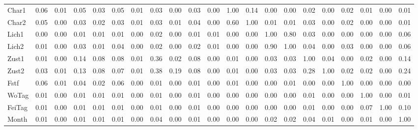 \begin{tabular}{lrrrrrrrrrrrrrrrrrrrr}
Char1   &     0.06 & 0.01 & 0.05 &   0.03 &   0.05 &   0.01 &   0.03 &   0.00 &   0.03 &   0.00 &   1.00 &   0.14 &   0.00 &   0.00 &   0.02 &   0.00 &  0.02 &   0.01 &    0.00 &   0.01 \\
Char2   &     0.05 & 0.00 & 0.03 &   0.02 &   0.03 &   0.01 &   0.03 &   0.01 &   0.04 &   0.00 &   0.60 &   1.00 &   0.01 &   0.01 &   0.03 &   0.00 &  0.02 &   0.00 &    0.00 &   0.01 \\
Lich1   &     0.00 & 0.00 & 0.01 &   0.01 &   0.01 &   0.00 &   0.02 &   0.00 &   0.01 &   0.01 &   0.00 &   0.00 &   1.00 &   0.80 &   0.03 &   0.00 &  0.00 &   0.00 &    0.00 &   0.06 \\
Lich2   &     0.01 & 0.00 & 0.03 &   0.01 &   0.04 &   0.00 &   0.02 &   0.00 &   0.02 &   0.01 &   0.00 &   0.00 &   0.90 &   1.00 &   0.04 &   0.00 &  0.03 &   0.00 &    0.00 &   0.06 \\
Zust1   &     0.01 & 0.00 & 0.14 &   0.08 &   0.08 &   0.01 &   0.36 &   0.02 &   0.08 &   0.00 &   0.01 &   0.00 &   0.03 &   0.03 &   1.00 &   0.04 &  0.00 &   0.02 &    0.00 &   0.14 \\
Zust2   &     0.03 & 0.01 & 0.13 &   0.08 &   0.07 &   0.01 &   0.38 &   0.19 &   0.08 &   0.00 &   0.01 &   0.00 &   0.03 &   0.03 &   0.28 &   1.00 &  0.02 &   0.02 &    0.00 &   0.24 \\
Fstf    &     0.06 & 0.01 & 0.04 &   0.02 &   0.06 &   0.00 &   0.01 &   0.00 &   0.01 &   0.00 &   0.01 &   0.00 &   0.00 &   0.01 &   0.00 &   0.00 &  1.00 &   0.00 &    0.00 &   0.00 \\
WoTag   &     0.01 & 0.00 & 0.01 &   0.01 &   0.01 &   0.00 &   0.01 &   0.00 &   0.01 &   0.00 &   0.00 &   0.00 &   0.00 &   0.00 &   0.01 &   0.00 &  0.00 &   1.00 &    0.00 &   0.01 \\
FeiTag  &     0.01 & 0.00 & 0.01 &   0.01 &   0.01 &   0.00 &   0.01 &   0.00 &   0.01 &   0.00 &   0.00 &   0.00 &   0.00 &   0.00 &   0.01 &   0.00 &  0.00 &   0.07 &    1.00 &   0.10 \\
Month   &     0.01 & 0.00 & 0.01 &   0.01 &   0.01 &   0.00 &   0.04 &   0.00 &   0.01 &   0.00 &   0.00 &   0.00 &   0.02 &   0.02 &   0.04 &   0.01 &  0.00 &   0.01 &    0.00 &   1.00 \\
\bottomrule
\end{tabular}
